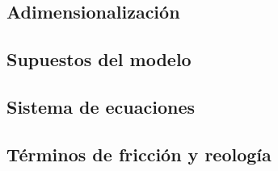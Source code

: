 \subsection{Adimensionalización}
\label{subsec:adimensionalizacion}


\subsection{Supuestos del modelo}

\subsection{Sistema de ecuaciones}

\subsection{Términos de fricción y reología}

